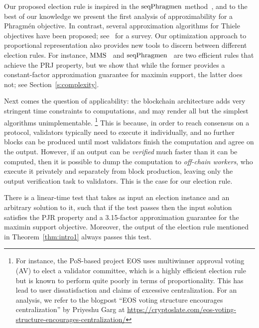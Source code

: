 Our proposed election rule is inspired in the $\operatorname{seqPhragmen}$ method~\cite{brill2017phragmen}, and to the best of our knowledge we present the first analysis of approximability for a Phragm\'{e}n objective. 
In contrast, several approximation algorithms for Thiele objectives have been proposed; see~\cite{lackner2020approval} for a survey. 
%
Our optimization approach to proportional representation also provides new tools to discern between different election rules. For instance, $\operatorname{MMS}$~\cite{sanchez2016maximin} and $\operatorname{seqPhragmen}$~\cite{brill2017phragmen} are two efficient rules that achieve the PRJ property, but we show that while the former provides a constant-factor approximation guarantee for maximin support, the latter does not; see Section~\ref{s:complexity}. 

Next comes the question of applicability: the blockchain architecture adds very stringent time constraints to computations, and may render all but the simplest algorithms unimplementable.%
%
\footnote{For instance, the PoS-based project EOS uses multiwinner approval voting (AV) to elect a validator committee, which is a highly efficient election rule but is known to perform quite poorly in terms of proportionality. This has lead to user dissatisfaction and claims of excessive centralization. 
For an analysis, we refer to the blogpost ``EOS voting structure encourages centralization'' by Priyeshu Garg at \url{https://cryptoslate.com/eos-voting-structure-encourages-centralization/}} %
% 
This is because, in order to reach consensus on a protocol, validators typically need to execute it individually, and no further blocks can be produced until most validators finish the computation and agree on the output. 
However, if an output can be \emph{verified} much faster than it can be computed, then it is possible to dump the computation to \emph{off-chain workers}, who execute it privately and separately from block production, leaving only the output verification task to validators. This is the case for our election rule.

\begin{theorem}\label{thm:intro2}
There is a linear-time test that takes as input an election instance and an arbitrary solution to it, such that if the test passes then the input solution satisfies the PJR property and a 3.15-factor approximation guarantee for the maximin support objective. 
Moreover, the output of the election rule mentioned in Theorem~\ref{thm:intro1} always passes this test.
\end{theorem}

